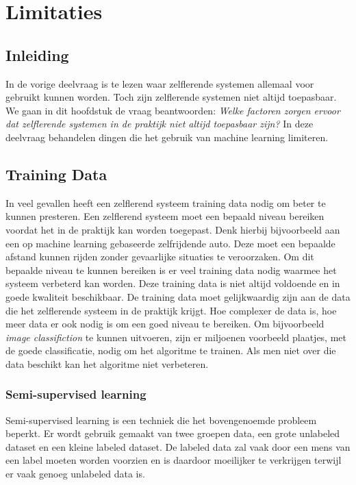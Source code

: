 \section{Limitaties}

\subsection{Inleiding}
In de vorige deelvraag is te lezen waar zelflerende systemen allemaal voor gebruikt kunnen worden. Toch zijn zelflerende systemen niet altijd toepasbaar. We gaan in dit hoofdstuk de vraag beantwoorden: \textit{Welke factoren zorgen ervoor dat zelflerende systemen in de praktijk niet altijd toepasbaar zijn?} In deze deelvraag behandelen dingen die het gebruik van machine learning limiteren. 

\subsection{Training Data}
In  veel gevallen heeft een zelflerend systeem training data nodig om beter te kunnen presteren. Een zelflerend systeem moet een bepaald niveau bereiken voordat het in de praktijk kan worden toegepast. Denk hierbij bijvoorbeeld aan een op machine learning gebaseerde zelfrijdende auto. Deze moet een bepaalde afstand kunnen rijden zonder gevaarlijke situaties te veroorzaken. Om dit bepaalde niveau te kunnen bereiken is er veel training data nodig waarmee het systeem verbeterd kan worden. Deze training data is niet altijd voldoende en in goede kwaliteit beschikbaar. De training data moet gelijkwaardig zijn aan de data die het zelflerende systeem in de praktijk krijgt. Hoe complexer de data is, hoe meer data er ook nodig is om een goed niveau te bereiken. Om bijvoorbeeld \textit{image classifiction} te kunnen uitvoeren, zijn er miljoenen voorbeeld plaatjes, met de goede classificatie, nodig om het algoritme te trainen. Als men niet over die data beschikt kan het algoritme niet verbeteren. 

\subsubsection{Semi-supervised learning}
Semi-supervised learning is een techniek die het bovengenoemde probleem beperkt. Er wordt gebruik gemaakt van twee groepen data, een grote unlabeled dataset en een kleine labeled dataset. De labeled data zal vaak door een mens van een label moeten worden voorzien en is daardoor moeilijker te verkrijgen terwijl er vaak genoeg unlabeled data is. \cite{SemiSupervisedLearning}


